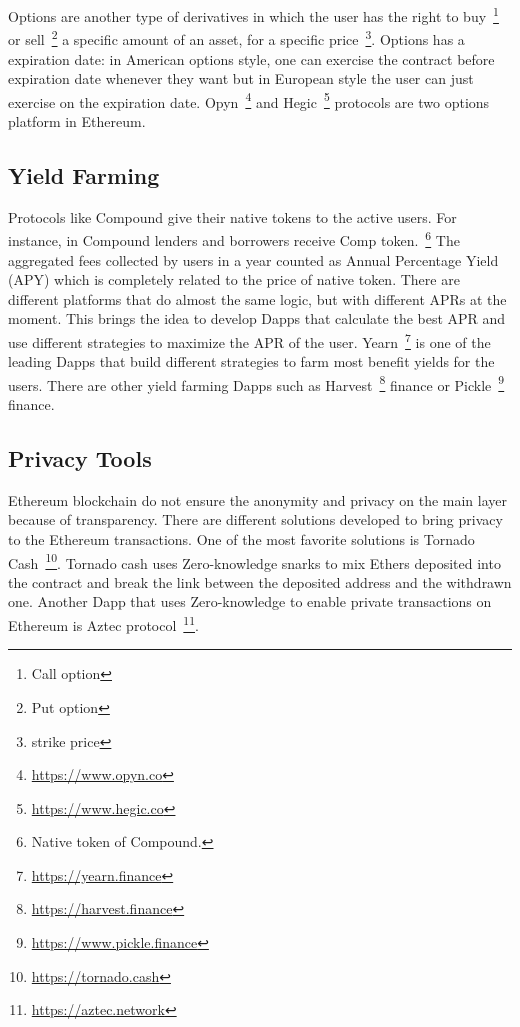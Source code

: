 Options are another type of derivatives in which the user has the right to buy~\footnote{Call option} or sell~\footnote{Put option} a specific amount of an asset, for a specific price~\footnote{strike price}. Options has a expiration date: in American options style, one can exercise the contract before expiration date whenever they want but in European style the user can just exercise on the expiration date. Opyn~\footnote{\url{https://www.opyn.co}} and Hegic~\footnote{\url{https://www.hegic.co}} protocols are two options platform in Ethereum.


\subsection{Yield Farming}
Protocols like Compound give their native tokens to the active users. For instance, in Compound lenders and borrowers receive Comp token.~\footnote{Native token of Compound.} The aggregated fees collected by users in a year counted as Annual Percentage Yield (APY) which is completely related to the price of native token. There are different platforms that do almost the same logic, but with different APRs at the moment. This brings the idea to develop Dapps that calculate the best APR and use different strategies to maximize the APR of the user. Yearn~\footnote{\url{https://yearn.finance}} is one of the leading Dapps that build different strategies to farm most benefit yields for the users. There are other yield farming Dapps such as Harvest~\footnote{\url{https://harvest.finance}} finance or Pickle~\footnote{\url{https://www.pickle.finance}} finance.

\subsection{Privacy Tools}
Ethereum blockchain do not ensure the anonymity and privacy on the main layer because of transparency. There are different solutions developed to bring privacy to the Ethereum transactions. One of the most favorite solutions is Tornado Cash~\footnote{\url{https://tornado.cash}}. Tornado cash uses Zero-knowledge snarks to mix Ethers deposited into the contract and break the link between the deposited address and the withdrawn one. Another Dapp that uses Zero-knowledge to enable private transactions on Ethereum is Aztec protocol~\footnote{\url{https://aztec.network}}.




